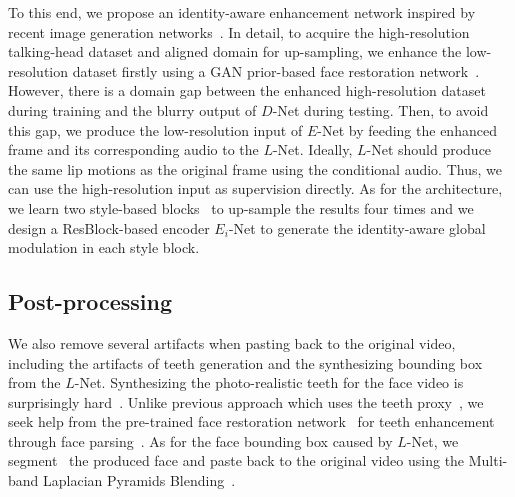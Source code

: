 To this end, we propose an identity-aware enhancement network inspired by recent image generation networks~\cite{stylegan2, eg3d}. In detail, to acquire the high-resolution talking-head dataset and aligned domain for up-sampling, we enhance the low-resolution dataset firstly using a GAN prior-based face restoration network~\cite{gpen}. However, there is a domain gap between the enhanced high-resolution dataset during training and the blurry output of $D$-Net during testing. Then, to avoid this gap, we produce the low-resolution input of $E$-Net by feeding the enhanced frame and its corresponding audio to the $L$-Net. Ideally, $L$-Net should produce the same lip motions as the original frame using the conditional audio. Thus, we can use the high-resolution input as supervision directly. As for the architecture, we learn two style-based blocks~\cite{stylegan2} to up-sample the results four times and we design a ResBlock-based encoder ${E}_i$-Net to generate the identity-aware global modulation in each style block.

\subsection{Post-processing}
\label{sec:post}
We also remove several artifacts when pasting back to the original video, including the artifacts of teeth generation and the synthesizing bounding box from the $L$-Net. Synthesizing the photo-realistic teeth for the face video is surprisingly hard~\cite{obama}. Unlike previous approach which uses the teeth proxy~\cite{obama}, we seek help from the pre-trained face restoration network~\cite{gfpgan} for teeth enhancement through face parsing~\cite{face_parser}. As for the face bounding box caused by $L$-Net, we segment~\cite{face_parser} the produced face and paste back to the original video using the Multi-band Laplacian Pyramids Blending~\cite{blend}.

